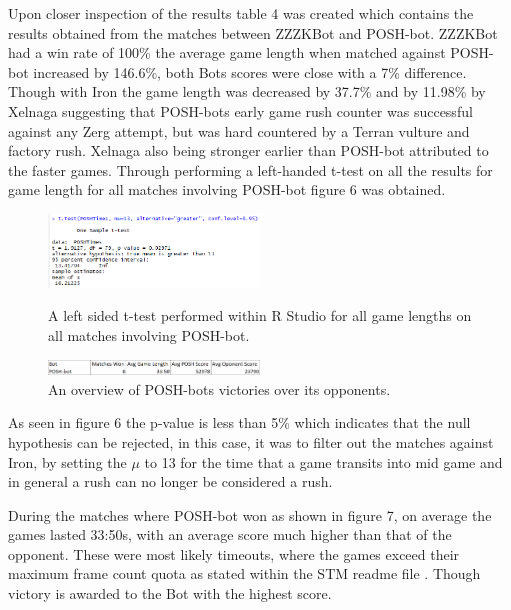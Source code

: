 \documentclass[journal]{IEEEtran}
\begin{document}
	Upon closer inspection of the results table 4 was created which contains the results obtained from the matches between ZZZKBot and POSH-bot. ZZZKBot had a win rate of 100\% the average game length when matched against POSH-bot increased by 146.6\%, both Bots scores were close with a 7\% difference. Though with Iron the game length was decreased by 37.7\% and by 11.98\% by Xelnaga suggesting that POSH-bots early game rush counter was successful against any Zerg attempt, but was hard countered by a Terran vulture and factory rush. Xelnaga also being stronger earlier than POSH-bot attributed to the faster games. Through performing a left-handed t-test on all the results for game length for all matches involving POSH-bot figure 6 was obtained.
	
	\begin{figure}[H]
		\centering
		\includegraphics[width=0.5\textwidth]{RPoshTimeLeft}
		\caption{A left sided t-test performed within R Studio for all game lengths on all matches involving POSH-bot.}
		\label{Fig5}
		\centering
		\includegraphics[width=0.5\textwidth]{PoshWinsandScore}
		\caption{An overview of POSH-bots victories over its opponents.}
		\label{poshonly}
	\end{figure}
	
	As seen in figure 6 the p-value is less than 5\% which indicates that the null hypothesis can be rejected, in this case, it was to filter out the matches against Iron, by setting the $\mu$ to 13 for the time that a game transits into mid game and in general a rush can no longer be considered a rush. 
	
	During the matches where POSH-bot won as shown in figure 7, on average the games lasted 33:50s, with an average score much higher than that of the opponent. These were most likely timeouts, where the games exceed their maximum frame count quota as stated within the STM readme file \cite{Tournament}. Though victory is awarded to the Bot with the highest score.
	
\end{document}
